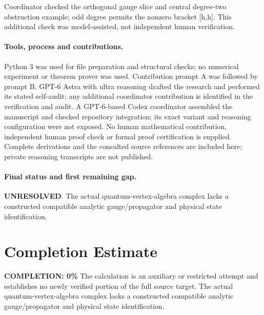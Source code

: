 \documentclass[11pt]{article}
\begin{document}
Coordinator checked the orthogonal gauge slice and central degree-two obstruction example; odd degree permits the nonzero bracket [h,h]. This additional check was model-assisted, not independent human verification.

\paragraph{Tools, process and contributions.}
Python 3 was used for file preparation and structural checks; no numerical experiment or theorem prover was used. Contribution prompt A was followed by prompt B. GPT-6 Astra with ultra reasoning drafted the research and performed its stated self-audit; any additional coordinator contribution is identified in the verification and audit. A GPT-6-based Codex coordinator assembled the manuscript and checked repository integration; its exact variant and reasoning configuration were not exposed. No human mathematical contribution, independent human proof check or formal proof certification is supplied. Complete derivations and the consulted source references are included here; private reasoning transcripts are not published.

\paragraph{Final status and first remaining gap.}
\textbf{UNRESOLVED}. The actual quantum-vertex-algebra complex lacks a constructed compatible analytic gauge/propagator and physical state identification.

\section{Completion Estimate}
\noindent\textbf{COMPLETION: 0\%}
The calculation is an auxiliary or restricted attempt and establishes no newly verified portion of the full source target. The actual quantum-vertex-algebra complex lacks a constructed compatible analytic gauge/propagator and physical state identification.
\end{document}
